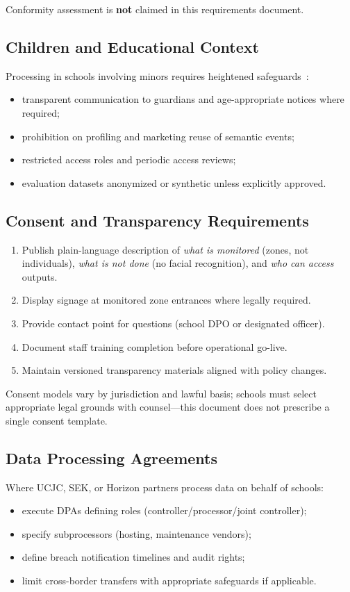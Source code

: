 Conformity assessment is \textbf{not} claimed in this requirements document.

\subsection{Children and Educational Context}

Processing in schools involving minors requires heightened safeguards~\cite{gdpr2016,mittelstadt2016ethics}:
\begin{itemize}[noitemsep]
  \item transparent communication to guardians and age-appropriate notices where required;
  \item prohibition on profiling and marketing reuse of semantic events;
  \item restricted access roles and periodic access reviews;
  \item evaluation datasets anonymized or synthetic unless explicitly approved.
\end{itemize}

\subsection{Consent and Transparency Requirements}

\begin{enumerate}[noitemsep]
  \item Publish plain-language description of \emph{what is monitored} (zones, not individuals),
        \emph{what is not done} (no facial recognition), and \emph{who can access} outputs.
  \item Display signage at monitored zone entrances where legally required.
  \item Provide contact point for questions (school DPO or designated officer).
  \item Document staff training completion before operational go-live.
  \item Maintain versioned transparency materials aligned with policy changes.
\end{enumerate}

Consent models vary by jurisdiction and lawful basis; schools must select appropriate
legal grounds with counsel---this document does not prescribe a single consent template.

\subsection{Data Processing Agreements}

Where UCJC, SEK, or Horizon partners process data on behalf of schools:
\begin{itemize}[noitemsep]
  \item execute DPAs defining roles (controller/processor/joint controller);
  \item specify subprocessors (hosting, maintenance vendors);
  \item define breach notification timelines and audit rights;
  \item limit cross-border transfers with appropriate safeguards if applicable.
\end{itemize}
